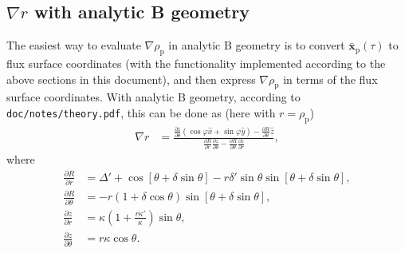 \documentclass{notes}
\begin{document}
\subsection{$\nabla r$ with analytic B geometry}
The easiest way to evaluate $\nabla \rho _\mathrm{p}$ in analytic B geometry is to convert $\bar{\mathbf{x}}_\mathrm{p}(\tau)$ to flux surface coordinates (with the functionality implemented according to the above sections in this document), and then express $\nabla \rho _\mathrm{p}$ in terms of the flux surface coordinates. With analytic B geometry, according to \texttt{doc/notes/theory.pdf}, this can be done as (here with $r=\rho _\mathrm{p}$)
\begin{align}
\nabla r &= \frac{\frac{\partial z}{\partial \theta} (\cos{\varphi}\hat{x} + \sin{\varphi}\hat{y}) - \frac{\partial R}{\partial \theta} \hat{z}}{\frac{\partial R}{\partial r}\frac{\partial z}{\partial \theta} - \frac{\partial R}{\partial \theta}\frac{\partial z}{\partial r}},
\end{align}
where
\begin{align}
\frac{\partial R}{\partial r} &= \Delta' + \cos[\theta+\delta\sin\theta]-r\delta'\sin\theta\sin[\theta+\delta\sin\theta], \nonumber \\
\frac{\partial R}{\partial \theta} &= -r(1+\delta\cos\theta)\sin[\theta+\delta\sin\theta],  \nonumber \\
\frac{\partial z}{\partial r} &=  \kappa\left(1+ \frac{r\kappa'}{\kappa}\right)\sin\theta, \nonumber \\
\frac{\partial z}{\partial \theta} &= r\kappa\cos\theta.
\end{align}
	

    
\end{document}

